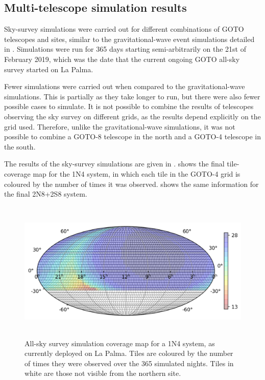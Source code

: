 
\subsection{Multi-telescope simulation results}
\label{sec:survey_sim_results}
\begin{colsection}

Sky-survey simulations were carried out for different combinations of GOTO telescopes and sites, similar to the gravitational-wave event simulations detailed in . Simulations were run for 365 days starting semi-arbitrarily on the 21st of February 2019, which was the date that the current ongoing GOTO all-sky survey started on La Palma.

Fewer simulations were carried out when compared to the gravitational-wave simulations. This is partially as they take longer to run, but there were also fewer possible cases to simulate. It is not possible to combine the results of telescopes observing the sky survey on different grids, as the results depend explicitly on the grid used. Therefore, unlike the gravitational-wave simulations, it was not possible to combine a GOTO-8 telescope in the north and a GOTO-4 telescope in the south.

The results of the sky-survey simulations are given in .  shows the final tile-coverage map for the 1N4 system, in which each tile in the GOTO-4 grid is coloured by the number of times it was observed.  shows the same information for the final 2N8+2S8 system.

\begin{figure}[p]
    \begin{center}
        \includegraphics[height=190pt]{images/survey_sims/365_1N4_lite.png}
    \end{center}
    \caption[All-sky survey simulation results: 1N4 system]{
        All-sky survey simulation coverage map for a 1N4 system, as currently deployed on La Palma. Tiles are coloured by the number of times they were observed over the 365 simulated nights. Tiles in white are those not visible from the northern site.
    }\label{fig:survey_sim_1n4}
\end{figure}


\end{colsection}
